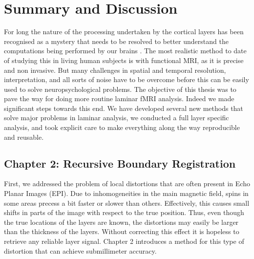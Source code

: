 
\chapter{Summary and Discussion}
\label{ch:discussion}

For long the nature of the processing undertaken by the cortical layers has been recognised as a mystery that needs to be resolved to better understand the computations being performed by our brains \cite{Miller2001}. The most realistic method to date of studying this in living human subjects is with functional MRI, as it is precise and non invasive. But many challenges in spatial and temporal resolution, interpretation, and all sorts of noise have to be overcome before this can be easily used to solve neuropsychological problems. The objective of this thesis was to pave the way for doing more routine laminar fMRI analysis. Indeed we made significant steps towards this end. We have developed several new methods that solve major problems in laminar analysis, we conducted a full layer specific analysis, and took explicit care to make everything along the way reproducible and reusable.

\section*{Chapter 2: Recursive Boundary Registration}
First, we addressed the problem of local distortions that are often present in Echo Planar Images (EPI). Due to inhomogeneities in the main magnetic field, spins in some areas precess a bit faster or slower than others. Effectively, this causes small shifts in parts of the image with respect to the true position. Thus, even though the true locations of the layers are known, the distortions may easily be larger than the thickness of the layers. Without correcting this effect it is hopeless to retrieve any reliable layer signal. Chapter 2 introduces a method for this type of distortion that can achieve submillimeter accuracy.

